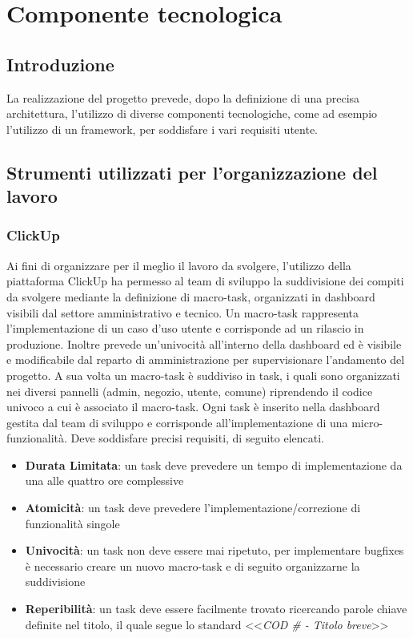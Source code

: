 \chapter{Componente tecnologica}
\section{Introduzione}
La realizzazione del progetto prevede, dopo la definizione di una precisa architettura, l'utilizzo di diverse componenti tecnologiche, come ad esempio l'utilizzo di un framework, per soddisfare i vari requisiti utente.
\section{Strumenti utilizzati per l'organizzazione del lavoro}
\subsection{ClickUp}
Ai fini di organizzare per il meglio il lavoro da svolgere, l'utilizzo della piattaforma ClickUp ha permesso al team di sviluppo la suddivisione dei compiti da svolgere mediante la definizione di macro-task, organizzati in dashboard visibili dal settore amministrativo e tecnico. Un macro-task rappresenta l'implementazione di un caso d'uso utente e corrisponde ad un rilascio in produzione. Inoltre prevede un'univocità all'interno della dashboard ed è visibile e modificabile dal reparto di amministrazione per supervisionare l'andamento del progetto. A sua volta un macro-task è suddiviso in task, i quali sono organizzati nei diversi pannelli (admin, negozio, utente, comune) riprendendo il codice univoco a cui è associato il macro-task. Ogni task è inserito nella dashboard gestita dal team di sviluppo e corrisponde all'implementazione di una micro-funzionalità. Deve soddisfare precisi requisiti, di seguito elencati.
\begin{itemize}
    \item \textbf{Durata Limitata}: un task deve prevedere un tempo di implementazione da una alle quattro ore complessive
    \item \textbf{Atomicità}: un task deve prevedere l'implementazione/correzione di funzionalità singole
    \item \textbf{Univocità}: un task non deve essere mai ripetuto, per implementare bugfixes è necessario creare un nuovo macro-task e di seguito organizzarne la suddivisione
    \item \textbf{Reperibilità}: un task deve essere facilmente trovato ricercando parole chiave definite nel titolo, il quale segue lo standard <<\textit{COD \# - Titolo breve}>>
\end{itemize}
